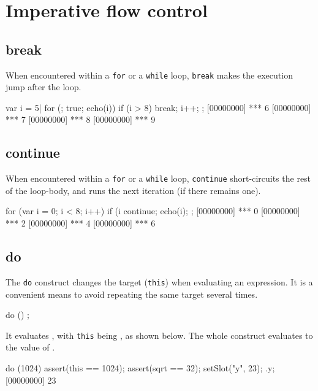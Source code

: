 \section{Imperative flow control}

\subsection{break}

When encountered within a \lstinline|for| or a \lstinline|while| loop,
\lstinline|break| makes the execution jump after the loop.

\begin{urbiscript}[firstnumber=last]
var i = 5|
for (; true; echo(i))
{
  if (i > 8)
    break;
  i++;
};
[00000000] *** 6
[00000000] *** 7
[00000000] *** 8
[00000000] *** 9
\end{urbiscript}

\subsection{continue}

When encountered within a \lstinline|for| or a \lstinline|while| loop,
\lstinline|continue| short-circuits the rest of the loop-body, and
runs the next iteration (if there remains one).

\begin{urbiscript}[firstnumber=last]
for (var i = 0; i < 8; i++)
{
  if (i %
    continue;
  echo(i);
};
[00000000] *** 0
[00000000] *** 2
[00000000] *** 4
[00000000] *** 6
\end{urbiscript}

\subsection{do}

The \lstinline|do| construct changes the target (\lstinline|this|)
when evaluating an expression.  It is a convenient means to avoid
repeating the same target several times.

\begin{urbiunchecked}[frame=, backgroundcolor=, ]
do ()
{
};
\end{urbiunchecked}

It evaluates , with \lstinline|this| being , as
shown below.  The whole construct evaluates to the value
of .

\begin{urbiscript}[firstnumber=last]
do (1024)
{
  assert(this == 1024);
  assert(sqrt == 32);
  setSlot("y", 23);
}.y;
[00000000] 23
\end{urbiscript}


